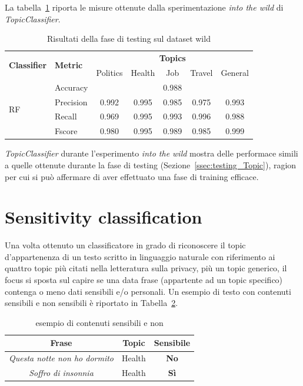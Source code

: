 La tabella~\ref{tbl:testing_wild} riporta le misure ottenute dalla sperimentazione \textit{into the wild} di \textit{TopicClassifier}. 
\begin{table}[h]
\begin{tabular}{|l|l|c|c|c|c|c|}
\hline
\multirow{2}{*}{\textbf{Classifier}} & \multirow{2}{*}{\textbf{Metric}} & \multicolumn{5}{c|}{\textbf{Topics}} \\ \cline{3-7} 
 &  & Politics & Health & Job & Travel & General \\ \hline
\multirow{4}{*}{RF} & Accuracy & \multicolumn{5}{c|}{0.988} \\ \cline{2-7} 
 & Precision & 0.992 & 0.995 & 0.985 & 0.975 & 0.993 \\ \cline{2-7} 
 & Recall & 0.969 & 0.995 & 0.993 & 0.996 & 0.988 \\ \cline{2-7} 
 & Fscore & 0.980 & 0.995 & 0.989 & 0.985 & 0.999 \\ \hline
\end{tabular}
\caption{Risultati della fase di testing sul dataset wild}
\label{tbl:testing_wild}
\end{table}
\FloatBarrier
\textit{TopicClassifier} durante l'esperimento \textit{into the wild} mostra delle performace simili a quelle ottenute durante la fase di testing (Sezione~\ref{ssec:testing_Topic}), ragion per cui si può affermare di aver effettuato una fase di training efficace.

\section{Sensitivity classification}
\label{sec:sensclass}
Una volta ottenuto un classificatore in grado di riconoscere il topic d'appartenenza di un testo scritto in linguaggio naturale con riferimento ai quattro topic più citati nella letteratura sulla privacy, più un topic generico, il focus si sposta sul capire se una data frase (appartente ad un topic specifico) contenga o meno dati sensibili e/o personali. Un esempio di testo con contenuti sensibili e non sensibili è riportato in Tabella~\ref{tbl:example_sens}.

\begin{table}[h]

\centering
\begin{tabular}{c|c|c}
\hline
\textbf{Frase} & \textbf{Topic} & \textbf{Sensibile} \\ \hline
\textit{Questa notte non ho dormito} & Health & \textbf{No} \\ \hline
\textit{Soffro di insonnia} & Health & \textbf{Sì} \\ \hline
\end{tabular}
\caption{esempio di contenuti sensibili e non}
\label{tbl:example_sens}
\end{table}
\FloatBarrier


